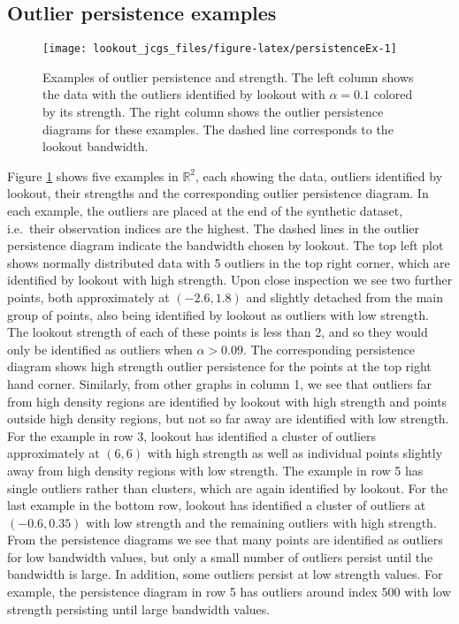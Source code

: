 \documentclass[12pt]{article}
\theoremstyle{definition}
\theoremstyle{definition}
\theoremstyle{definition}
\theoremstyle{remark}
\begin{document}
\hypertarget{sec:PersistenceExamples}{%
\subsection{Outlier persistence examples}\label{sec:PersistenceExamples}}

\begin{figure}
\texttt{[image: lookout\_jcgs\_files/figure-latex/persistenceEx-1]} \caption{Examples of outlier persistence and strength. The left column shows the data with the outliers identified by lookout with $\alpha = 0.1$ colored by its strength. The right column shows the outlier persistence diagrams for these examples. The dashed line corresponds to the lookout bandwidth.}\label{fig:persistenceEx}
\end{figure}

Figure \ref{fig:persistenceEx} shows five examples in \(\mathbb{R}^2\), each showing the data, outliers identified by lookout, their strengths and the corresponding outlier persistence diagram. In each example, the outliers are placed at the end of the synthetic dataset, i.e.~their observation indices are the highest. The dashed lines in the outlier persistence diagram indicate the bandwidth chosen by lookout. The top left plot shows normally distributed data with 5 outliers in the top right corner, which are identified by lookout with high strength. Upon close inspection we see two further points, both approximately at \((-2.6, 1.8)\) and slightly detached from the main group of points, also being identified by lookout as outliers with low strength. The lookout strength of each of these points is less than 2, and so they would only be identified as outliers when \(\alpha > 0.09\). The corresponding persistence diagram shows high strength outlier persistence for the points at the top right hand corner. Similarly, from other graphs in column 1, we see that outliers far from high density regions are identified by lookout with high strength and points outside high density regions, but not so far away are identified with low strength. For the example in row 3, lookout has identified a cluster of outliers approximately at \((6,6)\) with high strength as well as individual points slightly away from high density regions with low strength. The example in row 5 has single outliers rather than clusters, which are again identified by lookout. For the last example in the bottom row, lookout has identified a cluster of outliers at \((-0.6, 0.35)\) with low strength and the remaining outliers with high strength. From the persistence diagrams we see that many points are identified as outliers for low bandwidth values, but only a small number of outliers persist until the bandwidth is large. In addition, some outliers persist at low strength values. For example, the persistence diagram in row 5 has outliers around index 500 with low strength persisting until large bandwidth values.
\end{document}
